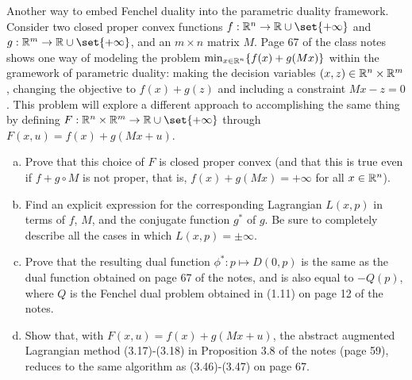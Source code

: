 \documentclass{article}
\begin{document}
\begin{problem}
    {Another way to embed Fenchel duality into the parametric duality framework.}
    Consider two closed proper convex functions $f:\R^n\rightarrow\R\cup\set{+\infty}$ and $g:\R^m\rightarrow\R\cup\set{+\infty}$, and an $m\times n$ matrix $M$. Page 67 of the class notes shows one way of modeling the problem $\min_{x\in\mathbb{R}^n}\lbrace f(x)+g(Mx)\rbrace$ within the gramework of parametric duality: making the decision variables $(x,z)\in\mathbb{R}^n\times \mathbb{R}^m$, changing the objective to $f(x)+g(z)$ and including a constraint $Mx-z=0$. This problem will explore a different approach to accomplishing the same thing by defining $F:\R^n\times\R^m\rightarrow\R\cup\set{+\infty}$ through $F(x,u)=f(x)+g(Mx+u)$.
    \begin{enumerate}[(a)]
        \item Prove that this choice of $F$ is closed proper convex (and that this is true even if $f+g\circ M$ is not proper, that is, $f(x)+g(Mx)=+\infty$ for all $x\in\mathbb{R}^n$).
        \item Find an explicit expression for the corresponding Lagrangian $L(x,p)$ in terms of $f$, $M$, and the conjugate function $g^*$ of $g$. Be sure to completely describe all the cases in which $L(x,p)=\pm\infty$.
        \item Prove that the resulting dual function $\phi^*:p\mapsto D(0,p)$ is the same as the dual function obtained on page 67 of the notes, and is also equal to $-Q(p)$, where $Q$ is the Fenchel dual problem obtained in (1.11) on page 12 of the notes.
        \item Show that, with $F(x,u)=f(x)+g(Mx+u)$, the abstract augmented Lagrangian method (3.17)-(3.18) in Proposition 3.8 of the notes (page 59), reduces to the same algorithm as (3.46)-(3.47) on page 67.
    \end{enumerate}
\end{problem}
\end{document}
